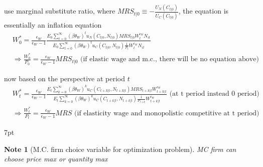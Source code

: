 \documentclass{article}
\newenvironment{blueblock}{
\def\FrameCommand{
  \hspace{1pt}
    {\color{DarkBlue}
    \vrule width 2pt}
    {\color{blueshade}
    \vrule width 4pt}
  \colorbox{blueshade}
}
\MakeFramed{
  \advance
  \hsize-
  \width
  \FrameRestore}
\noindent\hspace{-4.55pt}%
\begin{adjustwidth}{}{7pt}
\vspace{2pt}\vspace{2pt}
}
{\vspace{2pt}\end{adjustwidth}\endMakeFramed}
\newtheorem{note}{Note}
\begin{document}
use marginal substitute ratio, where $MRS_{t|0}\equiv -\frac{U_N(C_{t|0})}{U_C(C_{t|0})}$, the equation is essentially an inflation equation
\begin{align}
& W_0^*= \frac{\epsilon_W}{\epsilon_W-1}
\frac{
E_0 \sum\limits_{t=0}^{\infty} (\beta \theta_W)^t u_N(C_{t|0},N_{t|0})MRS_{t|0} W_t^{\epsilon_W}N_{it}
}{
E_0 \sum\limits_{t=0}^{\infty} (\beta \theta_W)^t u_C(C_{t|0},N_{t|0})\frac{1}{P_t} W_t^{\epsilon_W} N_{it}
}
\\& \Rightarrow \frac{W_0^*}{P_0}=\frac{\epsilon_W}{\epsilon_W-1}MRS_{t|0} \text{ (if elastic wage and m.c., there will be no equation above)}
\end{align}

now based on the perspective at period $t$
\begin{align}
& W_t^* = \frac{\epsilon_W}{\epsilon_W-1} 
\frac{E_t \sum\limits_{k=0}^{\infty}(\beta \theta_W)^k u_C(C_{t+k|t},N_{t+k|t})MRS_{t+k|t}W^{\epsilon_W}_{t+k|t}}{E_t \sum\limits_{k=0}^{\infty}(\beta \theta_W)^k u_C(C_{t+k|t},N_{t+k|t})\frac{1}{P_{t+k}}W^{\epsilon_W}_{t+k|t}}
\text{ (at t period instead 0 period)}
\\& \Rightarrow \frac{W_t^*}{P_t}=\frac{\epsilon_W}{\epsilon_W-1}MRS \text{ (if elasticity wage and monopolistic competitive at t period)}
\end{align}


\begin{blueblock}
\begin{note}[M.C. firm choice variable for optimization problem]
MC firm can choose price max or quantity max
\end{note}
\end{blueblock}
\end{document}

